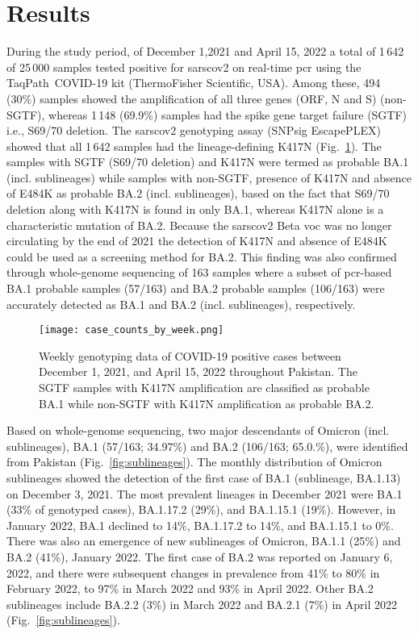 \section{Results}\label{2:sec-res}
During the study period, of December 1,2021 and April 15, 2022 a total of 1\,642 of 25\,000 samples tested positive for \gls{sarscov2} on real-time \gls{pcr} using the TaqPath\texttrademark\ COVID-19 kit (ThermoFisher Scientific, USA).
Among these, 494 (30\%) samples showed the amplification of all three genes (ORF, N and S) (non-SGTF), whereas 1\,148 (69.9\%) samples had the spike gene target failure (SGTF) i.e., S69/70 deletion.
The \gls{sarscov2} genotyping assay (SNPsig EscapePLEX) showed that all 1\,642 samples had the lineage-defining K417N (Fig.~\ref{fig:genotyped}).
The samples with SGTF (S69/70 deletion) and K417N were termed as probable BA.1 (incl. sublineages) while samples with non-SGTF, presence of K417N and absence of E484K as probable BA.2 (incl. sublineages), based on the fact that S69/70 deletion along with K417N is found in only BA.1, whereas K417N alone is a characteristic mutation of BA.2.
Because the \gls{sarscov2} Beta \gls{voc} was no longer circulating by the end of 2021 the detection of K417N and absence of E484K could be used as a screening method for BA.2.
This finding was also confirmed through whole-genome sequencing of 163 samples where a subset of \gls{pcr}-based BA.1 probable samples (57/163) and BA.2 probable samples (106/163) were accurately detected as BA.1 and BA.2 (incl. sublineages), respectively.

\begin{figure}[ht]
   \centering
   \texttt{[image: case\_counts\_by\_week.png]}
    \caption[Case counts December 2021--April 2022]{Weekly genotyping data of COVID-19 positive cases between December 1, 2021, and April 15, 2022 throughout Pakistan. The SGTF samples with K417N amplification are classified as probable BA.1 while non-SGTF with K417N amplification as probable BA.2.}
    \label{fig:genotyped}
\end{figure}

Based on whole-genome sequencing, two major descendants of Omicron (incl. sublineages), BA.1 (57/163; 34.97\%) and BA.2 (106/163; 65.0.\%), were identified from Pakistan (Fig.~\ref{fig:sublineages}).
The monthly distribution of Omicron sublineages showed the detection of the first case of BA.1 (sublineage, BA.1.13) on December 3, 2021.
The most prevalent lineages in December 2021 were BA.1 (33\% of genotyped cases), BA.1.17.2 (29\%), and BA.1.15.1 (19\%).
However, in January 2022, BA.1 declined to 14\%, BA.1.17.2 to 14\%, and BA.1.15.1 to 0\%.
There was also an emergence of new sublineages of Omicron, BA.1.1 (25\%) and BA.2 (41\%), January 2022.
The first case of BA.2 was reported on January 6, 2022, and there were subsequent changes in prevalence from 41\% to 80\% in February 2022, to 97\% in March 2022 and 93\% in April 2022.
Other BA.2 sublineages include BA.2.2 (3\%) in March 2022 and BA.2.1 (7\%) in April 2022 (Fig.~\ref{fig:sublineages}).

